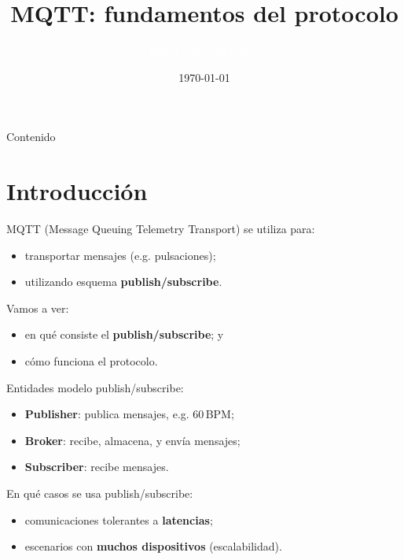 \documentclass[xcolor={x11names}]{beamer}
\title[MQTT]{MQTT: fundamentos del protocolo}
\author{\textcolor{white}{RSER curso 2024-2025}}
\date{\today}
\begin{document}
\frame{\titlepage }


\begin{frame}[allowframebreaks]{Contenido}
    \tableofcontents
\end{frame}




\section{Introducción}
\begin{frame}{\secname}
    MQTT (Message Queuing Telemetry Transport)
    se utiliza para:
    \begin{itemize}
        \item transportar mensajes (e.g. pulsaciones);
        \item utilizando esquema \textbf{publish/subscribe}.
    \end{itemize}

    \vfill
    Vamos a ver:
    \begin{itemize}
        \item en qué consiste el \textbf{publish/subscribe}; y
        \item cómo funciona el protocolo.
    \end{itemize}
\end{frame}




\begin{frame}{\secname}
    Entidades modelo publish/subscribe:
    \begin{itemize}
        \item \textbf{Publisher}: publica mensajes,
            e.g. 60\,\textrm{BPM};
        \item \textbf{Broker}: recibe, almacena, y envía mensajes;
        \item \textbf{Subscriber}: recibe mensajes.
    \end{itemize}
    \vspace{1em}
    \begin{figure}
        
    \end{figure}
\end{frame}



\begin{frame}{\secname}
    En qué casos se usa publish/subscribe:
    \begin{itemize}
        \item comunicaciones tolerantes a \textbf{latencias};
        \item escenarios con \textbf{muchos dispositivos}
            (escalabilidad).
    \end{itemize}
    \vspace{1em}
    \begin{figure}
        
    \end{figure}
\end{frame}
\end{document}
